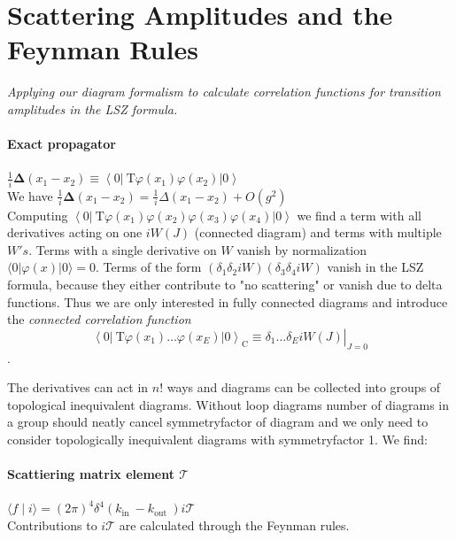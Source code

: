 \section{Scattering Amplitudes and the Feynman Rules}
\emph{Applying our diagram formalism to calculate correlation functions for transition amplitudes in the LSZ formula.}

\paragraph{Exact propagator} $\frac{1}{i} \boldsymbol{\Delta}\left(x_1-x_2\right) \equiv\left\langle 0\left|\mathrm{~T} \varphi\left(x_1\right) \varphi\left(x_2\right)\right| 0\right\rangle$ \\
We have $\frac{1}{i} \boldsymbol{\Delta}\left(x_1-x_2\right)=\frac{1}{i} \Delta\left(x_1-x_2\right)+O\left(g^2\right)$\\

Computing $\left\langle 0\left|\mathrm{~T} \varphi\left(x_1\right) \varphi\left(x_2\right) \varphi\left(x_3\right) \varphi\left(x_4\right)\right| 0\right\rangle$ 
we find a term with all derivatives acting on one $iW(J)$ (connected diagram) and terms with multiple $W's$. Terms with a single derivative on $W$ vanish by normalization
$\langle 0|\varphi(x)| 0\rangle=0$. Terms of the form $\left(\delta_1 \delta_2 i W\right)\left(\delta_3 \delta_4 i W\right)$ vanish 
in the LSZ formula, because they either contribute to "no scattering" or vanish due to delta functions. Thus we are only interested 
in fully connected diagrams and introduce the \emph{connected correlation function}
$$\left.\left\langle 0\left|\mathrm{~T} \varphi\left(x_1\right) \ldots \varphi\left(x_E\right)\right| 0\right\rangle_{\mathrm{C}} \equiv \delta_1 \ldots \delta_E i W(J)\right|_{J=0}$$.

The derivatives can act in $n!$ ways and diagrams can be collected into groups of 
topological inequivalent diagrams. Without loop diagrams number of diagrams in a group should neatly cancel 
symmetryfactor of diagram and we only need to consider topologically inequivalent diagrams with 
symmetryfactor 1. We find:\\

\paragraph{Scattiering matrix element $\mathcal{T} $} $\langle f \mid i\rangle=(2 \pi)^4 \delta^4\left(k_{\text {in }}-k_{\text {out }}\right) i \mathcal{T}$\\
Contributions to $i \mathcal{T}$ are calculated through the Feynman rules.

